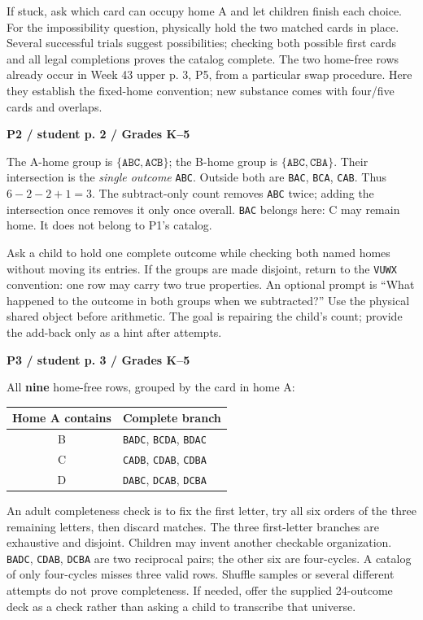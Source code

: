 \documentclass[11pt]{article}
\newcommand{\subhead}[1]{\par\textbf{#1}\par}
\newcommand{\row}[1]{\texttt{#1}}
\begin{document}
If stuck, ask which card can occupy home A and let children finish each choice. For the impossibility question, physically hold the two matched cards in place. Several successful trials suggest possibilities; checking both possible first cards and all legal completions proves the catalog complete. The two home-free rows already occur in Week 43 upper p. 3, P5, from a particular swap procedure. Here they establish the fixed-home convention; new substance comes with four/five cards and overlaps.

\subhead{P2 / student p. 2 / Grades K--5}
The A-home group is $\{\row{ABC},\row{ACB}\}$; the B-home group is $\{\row{ABC},\row{CBA}\}$. Their intersection is the \emph{single outcome} \row{ABC}. Outside both are \row{BAC}, \row{BCA}, \row{CAB}. Thus $6-2-2+1=\boxed{3}$. The subtract-only count removes \row{ABC} twice; adding the intersection once removes it only once overall. \row{BAC} belongs here: C may remain home. It does not belong to P1's catalog.

Ask a child to hold one complete outcome while checking both named homes without moving its entries. If the groups are made disjoint, return to the \row{VUWX} convention: one row may carry two true properties. An optional prompt is ``What happened to the outcome in both groups when we subtracted?'' Use the physical shared object before arithmetic. The goal is repairing the child's count; provide the add-back only as a hint after attempts.

\subhead{P3 / student p. 3 / Grades K--5}
All \textbf{nine} home-free rows, grouped by the card in home A:
\begin{center}\begin{tabular}{@{}cl@{}}\toprule
Home A contains & Complete branch\\\midrule
B&\row{BADC}, \row{BCDA}, \row{BDAC}\\
C&\row{CADB}, \row{CDAB}, \row{CDBA}\\
D&\row{DABC}, \row{DCAB}, \row{DCBA}\\\bottomrule
\end{tabular}\end{center}

An adult completeness check is to fix the first letter, try all six orders of the three remaining letters, then discard matches. The three first-letter branches are exhaustive and disjoint. Children may invent another checkable organization. \row{BADC}, \row{CDAB}, \row{DCBA} are two reciprocal pairs; the other six are four-cycles. A catalog of only four-cycles misses three valid rows. Shuffle samples or several different attempts do not prove completeness. If needed, offer the supplied 24-outcome deck as a check rather than asking a child to transcribe that universe.
\end{document}
